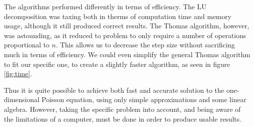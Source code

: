 \documentclass[english]{article}
\begin{document}
The algorithms performed differently in terms of efficiency. The LU decomposition was taxing both in therms of computation time and memory usage, although it still produced correct results. The Thomas algorithm, however, was astounding, as it reduced to problem to only require a number of operations proportional to $n$. This allows us to decrease the step size without sacrificing much in terms of efficiency. We could even simplify the general Thomas algorithm to fit our specific one, to create a slightly faster algorithm, as seen in figure \ref{fig:time}.

Thus it is quite possible to achieve both fast and accurate solution to the one-dimensional Poisson equation, using only simple approximations and some linear algebra. However, taking the specific problem into account, and being aware of the limitations of a computer, must be done in order to produce usable results.



\printbibliography
\end{document}

